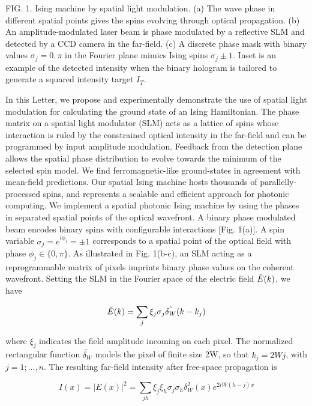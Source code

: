 FIG. 1. Ising machine by spatial light modulation. (a) The wave phase in different spatial points gives the spins evolving through optical propagation. (b) An amplitude-modulated laser beam is phase modulated by a reflective SLM and detected by a CCD camera in the far-field. (c) A discrete phase mask with binary values $\sigma_j = 0, \pi$ in the Fourier plane mimics Ising spins $\sigma_j \pm 1$. Inset is an example of the detected intensity when the binary hologram is tailored to generate a squared intensity target $I_T$.

In this Letter, we propose and experimentally demonstrate the use of spatial light modulation for calculating the ground state of an Ising Hamiltonian. The phase matrix on a spatial light modulator (SLM) acts as a lattice of spins whose interaction is ruled by the constrained optical intensity in the far-field and can be programmed by input amplitude modulation. Feedback from the detection plane allows the spatial phase distribution to evolve towards the minimum of the selected spin model. We find ferromagnetic-like ground-states in agreement with mean-field predictions. Our spatial Ising machine hosts thousands of parallelly-processed spins, and represents a scalable and efficient approach for photonic computing. We implement a spatial photonic Ising machine by using the phases in separated spatial points of the optical wavefront. A binary phase modulated beam encodes binary spins with configurable interactions [Fig. 1(a)]. A spin variable $\sigma_j = e^{i\phi_j} = \pm 1$ corresponds to a spatial point of the optical field with phase $\phi_j \in \{0, \pi\}$. As illustrated in Fig. 1(b-c), an SLM acting as a reprogrammable matrix of pixels imprints binary phase values on the coherent wavefront. Setting the SLM in the Fourier space of the electric field $\Tilde{E}(k)$, we have

\begin{equation}
\tilde{E}(k) = \sum_j {\xi_j \sigma_j \Tilde{\delta_W}(k-k_j)}
\end{equation}

where $\xi_j$ indicates the field amplitude incoming on each pixel. The normalized rectangular function $\tilde{\delta_W}$ models the pixel of finite size 2W, so that $k_j = 2Wj$, with $j = 1;..., n$. The resulting far-field intensity after
free-space propagation is

\begin{equation}
I(x) = |E(x)|^2 = \sum_{jh} {\xi_j \xi_h \sigma_j  \sigma_h \delta_W^2(x) e^{2iW(h-j)x}}
\end{equation}

